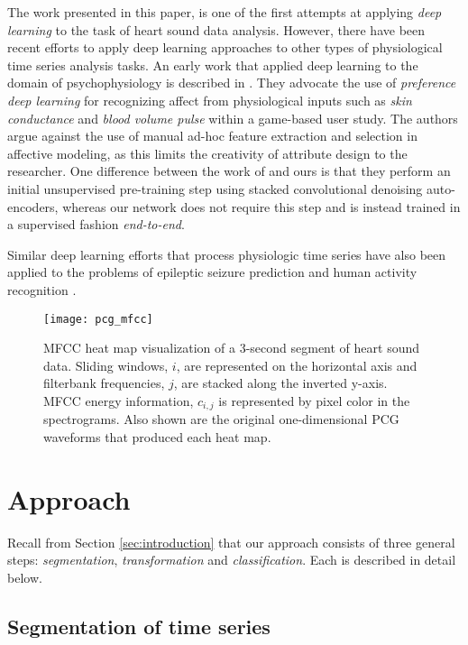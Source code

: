 \documentclass{article}
\begin{document}
The work presented in this paper, is one of the first attempts at applying \emph{deep learning} to the task of heart sound data analysis. However, there have been recent efforts to apply deep learning approaches to other types of physiological time series analysis tasks. An early work that applied deep learning to the domain of psychophysiology is described in \cite{DBLP:journals/cim/MartinezBY13}. They advocate the use of \emph{preference deep learning} for recognizing affect from physiological inputs such as \emph{skin conductance} and \emph{blood volume pulse} within a game-based user study. The authors argue against the use of manual ad-hoc feature extraction and selection in affective modeling, as this limits the creativity of attribute design to the researcher. One difference between the work of \cite{DBLP:journals/cim/MartinezBY13} and ours is that they perform an initial unsupervised pre-training step using stacked convolutional denoising auto-encoders, whereas our network does not require this step and is instead trained in a supervised fashion \emph{end-to-end}.

Similar deep learning efforts that process physiologic time series have also been applied to the problems of epileptic seizure prediction \cite{mirowski2008comparing} and human activity recognition \cite{DBLP:conf/ijcai/HammerlaHP16}.

\begin{figure*}
\texttt{[image: pcg\_mfcc]}
\caption{MFCC heat map visualization of a 3-second segment of heart sound data. Sliding windows, $i$, are represented on the horizontal axis and filterbank frequencies, $j$, are stacked along the inverted y-axis. MFCC energy information, $c_{i,j}$ is represented by pixel color in the spectrograms. Also shown are the original one-dimensional PCG waveforms that produced each heat map.}
\label{fig:heatmap}
\end{figure*}

\section{Approach}
\label{sec:approach}

Recall from Section \ref{sec:introduction} that our approach consists of three general steps: \emph{segmentation}, \emph{transformation} and \emph{classification}. Each is described in detail below.

\subsection{Segmentation of time series}
\end{document}
